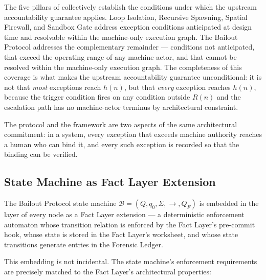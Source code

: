 The five pillars of \bxthree{} collectively establish the conditions under which the upstream accountability guarantee applies. Loop Isolation, Recursive Spawning, Spatial Firewall, and Sandbox Gate address exception conditions anticipated at design time and resolvable within the machine-only execution graph. The Bailout Protocol addresses the complementary remainder — conditions not anticipated, that exceed the operating range of any machine actor, and that cannot be resolved within the machine-only execution graph. The completeness of this coverage is what makes the upstream accountability guarantee unconditional: it is not that \emph{most} exceptions reach $h(n)$, but that \emph{every} exception reaches $h(n)$, because the trigger condition fires on any condition outside $R(n)$ and the escalation path has no machine-actor terminus by architectural constraint.

The protocol and the framework are two aspects of the same architectural commitment: in a \bxthree{} system, every exception that exceeds machine authority reaches a human who can bind it, and every such exception is recorded so that the binding can be verified.

\subsection{State Machine as Fact Layer Extension}\label{sec:state-machine-fact-layer}

The Bailout Protocol state machine $\mathcal{B} = (Q, q_0, \Sigma, \rightarrow, Q_F)$ is embedded in the \fact{} layer of every \bxthree{} node as a Fact Layer extension — a deterministic enforcement automaton whose transition relation is enforced by the Fact Layer's pre-commit hook, whose state is stored in the Fact Layer's worksheet, and whose state transitions generate entries in the Forensic Ledger.

This embedding is not incidental. The state machine's enforcement requirements are precisely matched to the Fact Layer's architectural properties:

